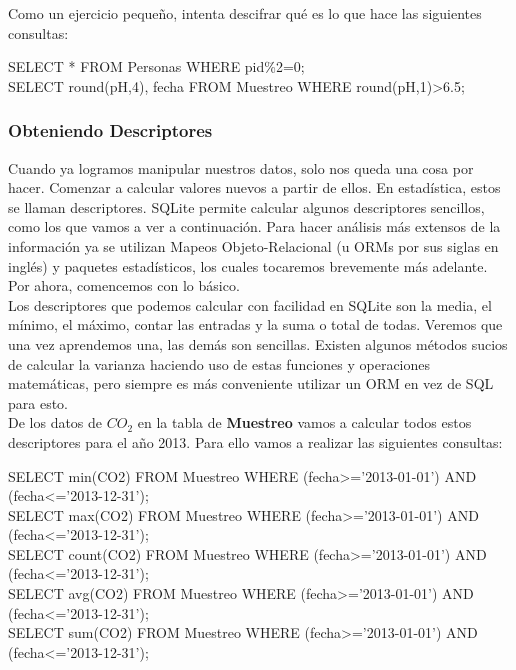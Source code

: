 \documentclass[10pt,letterpaper]{article}
\newenvironment{Code}
{
\begin{lrbox}{\selvestebox}%
\begin{minipage}{\dimexpr\columnwidth-2\fboxsep\relax}
\fontfamily{\ttdefault}\selectfont
}
{\end{minipage}\end{lrbox}%
\begin{center}
\colorbox{light-gray}{\usebox{\selvestebox}}
\end{center}
}
\begin{document}
Como un ejercicio peque\~no, intenta descifrar qu\'e es lo que hace las siguientes consultas:
\begin{Code}
SELECT * FROM Personas WHERE pid\%2=0;\\
SELECT round(pH,4), fecha FROM Muestreo WHERE round(pH,1)>6.5;
\end{Code}

\subsubsection{Obteniendo Descriptores}
Cuando ya logramos manipular nuestros datos, solo nos queda una cosa por hacer. Comenzar a calcular valores nuevos a partir de ellos. En estad\'istica, estos se llaman descriptores. SQLite permite calcular algunos descriptores sencillos, como los que vamos a ver a continuaci\'on. Para hacer an\'alisis m\'as extensos de la informaci\'on ya se utilizan Mapeos Objeto-Relacional (u ORMs por sus siglas en ingl\'es) y paquetes estad\'isticos, los cuales tocaremos brevemente m\'as adelante. Por ahora, comencemos con lo b\'asico.\\

Los descriptores que podemos calcular con facilidad en SQLite son la media, el m\'inimo, el m\'aximo, contar las entradas y la suma o total de todas. Veremos que una vez aprendemos una, las dem\'as son sencillas. Existen algunos m\'etodos sucios de calcular la varianza haciendo uso de estas funciones y operaciones matem\'aticas, pero siempre es m\'as conveniente utilizar un ORM en vez de SQL para esto.\\

De los datos de $CO_2$ en la tabla de \textbf{Muestreo} vamos a calcular todos estos descriptores para el a\~no 2013. Para ello vamos a realizar las siguientes consultas:

\begin{Code}
SELECT min(CO2) FROM Muestreo WHERE (fecha>='2013-01-01') AND (fecha<='2013-12-31');\\
SELECT max(CO2) FROM Muestreo WHERE (fecha>='2013-01-01') AND (fecha<='2013-12-31');\\
SELECT count(CO2) FROM Muestreo WHERE (fecha>='2013-01-01') AND (fecha<='2013-12-31');\\
SELECT avg(CO2) FROM Muestreo WHERE (fecha>='2013-01-01') AND (fecha<='2013-12-31');\\
SELECT sum(CO2) FROM Muestreo WHERE (fecha>='2013-01-01') AND (fecha<='2013-12-31');
\end{Code}
\end{document}
